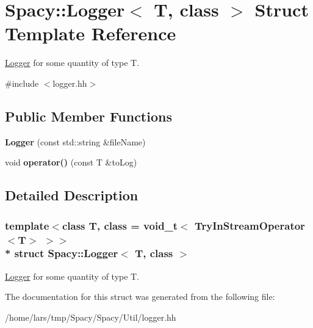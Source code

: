 \hypertarget{structSpacy_1_1Logger}{}\section{Spacy\+:\+:Logger$<$ T, class $>$ Struct Template Reference}
\label{structSpacy_1_1Logger}


\hyperlink{structSpacy_1_1Logger}{Logger} for some quantity of type T.  




{\ttfamily \#include $<$logger.\+hh$>$}

\subsection*{Public Member Functions}
\begin{DoxyCompactItemize}
\item 
{\bfseries Logger} (const std\+::string \&file\+Name)\hypertarget{structSpacy_1_1Logger_a689f95f10f159c8f4c3a841ffcdeaac8}{}\label{structSpacy_1_1Logger_a689f95f10f159c8f4c3a841ffcdeaac8}

\item 
void {\bfseries operator()} (const T \&to\+Log)\hypertarget{structSpacy_1_1Logger_a4ee5bc204534bc4a3bd9b7e875c3a350}{}\label{structSpacy_1_1Logger_a4ee5bc204534bc4a3bd9b7e875c3a350}

\end{DoxyCompactItemize}


\subsection{Detailed Description}
\subsubsection*{template$<$class T, class = void\+\_\+t$<$ Try\+In\+Stream\+Operator$<$\+T$>$ $>$$>$\\*
struct Spacy\+::\+Logger$<$ T, class $>$}

\hyperlink{structSpacy_1_1Logger}{Logger} for some quantity of type T. 

The documentation for this struct was generated from the following file\+:\begin{DoxyCompactItemize}
\item 
/home/lars/tmp/\+Spacy/\+Spacy/\+Util/logger.\+hh\end{DoxyCompactItemize}

